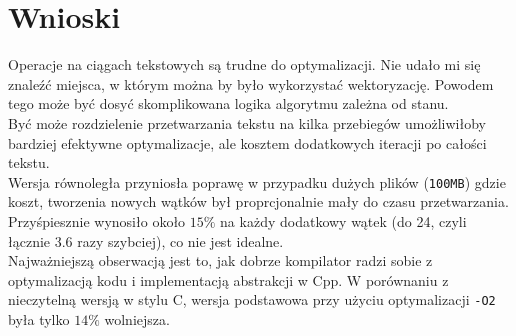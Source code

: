\documentclass[12pt]{article}
\begin{document}
\section*{Wnioski}
Operacje na ciągach tekstowych są trudne do optymalizacji. 
Nie udało mi się znaleźć miejsca, w którym można by było
wykorzystać wektoryzację. Powodem tego może być dosyć 
skomplikowana logika algorytmu zależna od stanu. \\

Być może rozdzielenie przetwarzania tekstu na kilka przebiegów
umożliwiłoby bardziej efektywne optymalizacje, ale kosztem dodatkowych
iteracji po całości tekstu. \\

Wersja równoległa przyniosła poprawę w przypadku dużych plików (\verb|100MB|) 
gdzie koszt, tworzenia nowych wątków był proprcjonalnie mały do czasu przetwarzania.
Przyśpiesznie wynosiło około $15\%$ na każdy dodatkowy wątek (do 24, 
czyli łącznie $3.6$ razy szybciej), co nie jest idealne. \\

Najważniejszą obserwacją jest to, jak dobrze kompilator radzi sobie
z optymalizacją kodu i implementacją abstrakcji w Cpp.
W porównaniu z nieczytelną wersją w stylu C, wersja podstawowa przy 
użyciu optymalizacji \verb|-O2| była tylko $14\%$ wolniejsza.
\end{document}
